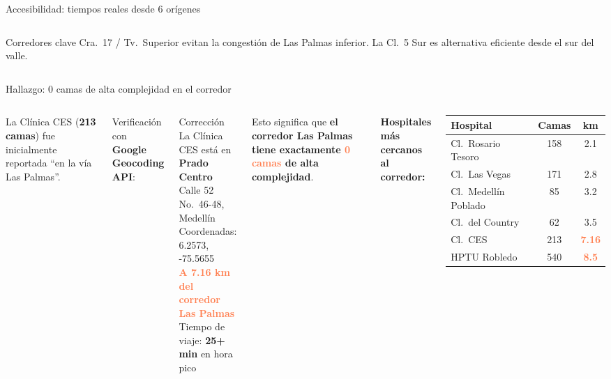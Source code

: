 \documentclass[aspectratio=169, 11pt]{beamer}
\newcommand{\danger}[1]{\textcolor{coral}{\textbf{#1}}}
\begin{document}
\begin{frame}{Accesibilidad: tiempos reales desde 6 orígenes}
\begin{columns}[T]
\begin{block}{\small Corredores clave}
\small Cra.\ 17 / Tv.\ Superior evitan la congestión de Las Palmas inferior. La Cl.\ 5 Sur es alternativa eficiente desde el sur del valle.
\end{block}
\end{columns}
\end{frame}

{
\begin{frame}{Hallazgo: 0 camas de alta complejidad en el corredor}

\begin{columns}[T]
La Clínica CES (\textbf{213 camas}) fue inicialmente reportada ``en la vía Las Palmas''.

\vspace{6pt}
Verificación con \textbf{Google Geocoding API}:

\vspace{6pt}
\begin{alertblock}{\small Corrección}
\small La Clínica CES está en \textbf{Prado Centro}\\
Calle 52 No.\ 46-48, Medellín\\
Coordenadas: 6.2573, -75.5655\\[4pt]
\danger{A 7.16 km del corredor Las Palmas}\\
Tiempo de viaje: \textbf{25+ min} en hora pico
\end{alertblock}

\vspace{6pt}
Esto significa que \textbf{el corredor Las Palmas tiene exactamente \danger{0 camas} de alta complejidad}.

\textbf{Hospitales más cercanos al corredor:}

\vspace{6pt}
{\small
\begin{tabular}{@{}lcc@{}}
\toprule
\textbf{Hospital} & \textbf{Camas} & \textbf{km} \\
\midrule
Cl.\ Rosario Tesoro & 158 & 2.1 \\
Cl.\ Las Vegas & 171 & 2.8 \\
Cl.\ Medellín Poblado & 85 & 3.2 \\
Cl.\ del Country & 62 & 3.5 \\
\rowcolor{coral!8}
Cl.\ CES & 213 & \danger{7.16} \\
\rowcolor{coral!8}
HPTU Robledo & 540 & \danger{8.5} \\
\bottomrule
\end{tabular}
}


\end{columns}
\end{frame}}
\end{document}
